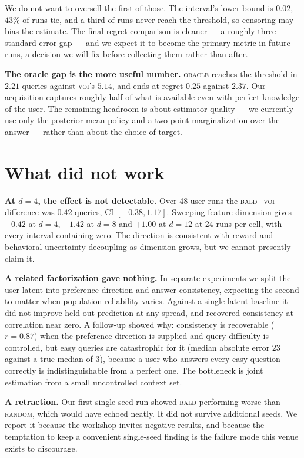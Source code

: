 \documentclass[10pt]{article}
\begin{document}
We do not want to oversell the first of those. The interval's lower bound is
$0.02$, $43\%$ of runs tie, and a third of runs never reach the threshold, so
censoring may bias the estimate. The final-regret comparison is cleaner --- a
roughly three-standard-error gap --- and we expect it to become the primary
metric in future runs, a decision we will fix before collecting them rather
than after.

\textbf{The oracle gap is the more useful number.} \textsc{oracle} reaches the
threshold in $2.21$ queries against \textsc{voi}'s $5.14$, and ends at regret %
$0.25$ against $2.37$. %
Our acquisition captures roughly half of what is
available even with perfect knowledge of the user. The remaining headroom is
about estimator quality --- we currently use only the posterior-mean policy and
a two-point marginalization over the answer --- rather than about the choice of
target.

\section{What did not work}

\textbf{At $d{=}4$, the effect is not detectable.} Over 48 user-runs the
\textsc{bald}$-$\textsc{voi} difference was $0.42$ queries, CI $[-0.38, 1.17]$.
Sweeping feature dimension gives $+0.42$ at $d{=}4$, $+1.42$ at $d{=}8$ and
$+1.00$ at $d{=}12$ at 24 runs per cell, with every interval containing zero.
The direction is consistent with reward and behavioral uncertainty decoupling as
dimension grows, but we cannot presently claim it.

\textbf{A related factorization gave nothing.} In separate experiments we split
the user latent into preference direction and answer consistency, expecting the
second to matter when population reliability varies. Against a single-latent
baseline it did not improve held-out prediction at any spread, and recovered
consistency at correlation near zero. A follow-up showed why: consistency is
recoverable ($r = 0.87$) when the preference direction is supplied and query
difficulty is controlled, but easy queries are catastrophic for it (median
absolute error $23$ against a true median of $3$), because a user who answers
every easy question correctly is indistinguishable from a perfect one. The
bottleneck is joint estimation from a small uncontrolled context set.

\textbf{A retraction.} Our first single-seed run showed \textsc{bald}
performing worse than \textsc{random}, which would have echoed
\citet{bickfordsmith2023} neatly. It did not survive additional seeds. We
report it because the workshop invites negative results, and because the
temptation to keep a convenient single-seed finding is the failure mode this
venue exists to discourage.
\end{document}
